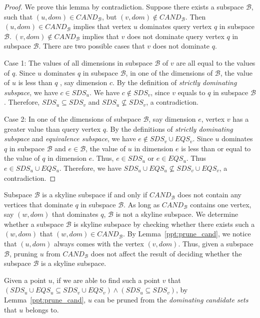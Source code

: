 \begin{proof}
We prove this lemma by contradiction. Suppose there exists a subspace $\mathcal{B}$, such that $(u, dom) \in \mathit{CAND}_\mathcal{B}$, but $(v, dom) \not\in \mathit{CAND}_\mathcal{B}$. Then $(u, dom) \in \mathit{CAND}_\mathcal{B}$ implies that vertex $u$ dominates query vertex $q$ in subspace $\mathcal{B}$.
$(v, dom) \not\in \mathit{CAND}_\mathcal{B}$ implies that $v$ does not dominate query vertex $q$ in subspace $\mathcal{B}$. There are two possible cases that $v$ does not dominate $q$.

Case 1: The values of all dimensions in subspace $\mathcal{B}$ of $v$ are all equal to the values of $q$. Since $u$ dominates $q$ in subspace $\mathcal{B}$, in one of the dimensions of $\mathcal{B}$, the value of $u$ is less than $q$ , say dimension $c$. By the definition of \emph{strictly dominating subspace}, we have $c \in SDS_u$. We have $c \notin SDS_v$, since $v$ equals to $q$ in subspace $\mathcal{B}$. Therefore, $SDS_u \subseteq SDS_v$ and $SDS_u \not\subseteq SDS_v$, a contradiction.

Case 2: In one of the dimensions of subspace $\mathcal{B}$, say dimension $e$, vertex $v$ has a greater value than query vertex $q$. By the definitions of \emph{strictly dominating subspace} and \emph{equivalence subspace}, we have $e \notin SDS_v \cup EQS_v$. Since $u$ dominates $q$ in subspace $\mathcal{B}$ and $e \in \mathcal{B}$, the value of $u$ in dimension $e$ is less than or equal to the value of $q$ in dimension $e$. Thus, $e \in SDS_u$ or $e \in EQS_u$. Thus $e \in SDS_u \cup EQS_u$. Therefore, we have $SDS_u \cup EQS_u \not\subseteq SDS_v \cup EQS_v$, a contradiction.
\end{proof}


Subspace $\mathcal{B}$ is a skyline subspace if and only if $\mathit{CAND}_\mathcal{B}$ does not contain any vertices that dominate $q$ in subspace $\mathcal{B}$. As long as $\mathit{CAND}_\mathcal{B}$ contains one vertex, say $(w, dom)$ that dominates $q$, $\mathcal{B}$ is not a skyline subspace. We determine whether a subspace $\mathcal{B}$ is skyline subspace by checking whether there exists such a $(w, dom)$ that $(w, dom) \in \mathit{CAND}_\mathcal{B}$. By Lemma~\ref{ppt:prune_cand}, we notice that $(u, dom)$ always comes with the vertex $(v, dom)$. Thus, given a subspace $\mathcal{B}$, pruning $u$ from $\mathit{CAND}_\mathcal{B}$ does not affect the result of deciding whether the subspace $\mathcal{B}$ is a skyline subspace.


Given a point $u$, if we are able to find such a point $v$ that $(SDS_u \cup EQS_u \subseteq SDS_v \cup EQS_v) \wedge (SDS_u \subseteq SDS_v)$, by Lemma~\ref{ppt:prune_cand}, $u$ can be pruned from the \emph{dominating candidate sets} that $u$ belongs to.

